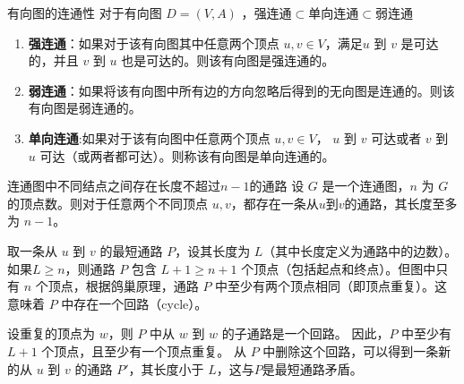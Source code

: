 \begin{definition}{有向图的连通性}{}
对于有向图 $D = (V, A)$ ，$\text{强连通} \subset \text{单向连通} \subset \text{弱连通}$
\begin{enumerate}
    \item \textbf{强连通}：如果对于该有向图其中任意两个顶点 $u, v \in V$，满足$u$ 到 $v$ 是可达的，并且 $v$ 到 $u$ 也是可达的。则该有向图是强连通的。
\item\textbf{弱连通}：如果将该有向图中所有边的方向忽略后得到的无向图是连通的。则该有向图是弱连通的。
\item\textbf{单向连通}:如果对于该有向图中任意两个顶点 $u, v \in V$， $u$ 到 $v$ 可达或者 $v$ 到 $u$ 可达（或两者都可达）。则称该有向图是单向连通的。
\end{enumerate}
\end{definition}
\begin{theorem}{连通图中不同结点之间存在长度不超过$n-1$的通路}{}
    设 $G$ 是一个连通图，$n$ 为 $G$ 的顶点数。则对于任意两个不同顶点 $u, v$，都存在一条从$u$到$v$的通路，其长度至多为 $n-1$。
\end{theorem}
    取一条从 $u$ 到 $v$ 的最短通路 $P$，设其长度为 $L$（其中长度定义为通路中的边数）。
    如果$L\geqslant n$，则通路 $P$ 包含 $L+1\geqslant n+1$ 个顶点（包括起点和终点）。但图中只有 $n$ 个顶点，根据鸽巢原理，通路 $P$ 中至少有两个顶点相同（即顶点重复）。这意味着 $P$ 中存在一个回路（cycle）。
    
    设重复的顶点为 $w$，则 $P$ 中从 $w$ 到 $w$ 的子通路是一个回路。
    因此，$P$ 中至少有 $L+1$ 个顶点，且至少有一个顶点重复。
    从 $P$ 中删除这个回路，可以得到一条新的从 $u$ 到 $v$ 的通路 $P'$，其长度小于 $L$，这与$P$是最短通路矛盾。
    
